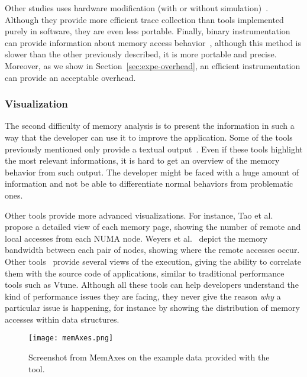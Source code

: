 Other studies uses hardware modification (with or without simulation)~\cite{Bao08HMTT,Martonosi92MemSpy}.
Although they provide more efficient trace collection than tools implemented purely in software, they are even less portable.
Finally, binary instrumentation can provide information about memory access behavior~\cite{DeRose02SIGMA}, although this method is slower than
the other previously described, it is more portable and precise. Moreover, as
we show in Section~\ref{sec:expe-overhead}, an efficient instrumentation can
provide an acceptable overhead.

\subsubsection{Visualization}

The second difficulty of memory analysis is to present the information in such
a way that the developer can use it to improve the application. Some of the tools
previously mentioned only provide a textual
output~\cite{Lachaize12MemProf,McCurdy2010,Martonosi92MemSpy}. Even if these
tools highlight the most relevant informations, it is hard to get an overview
of the memory behavior from such output. The developer might be faced with a huge
amount of information and not be able to differentiate normal behaviors from
problematic ones.


Other tools provide more advanced visualizations. For
instance, Tao et al.~\cite{Tao01Visualizing} propose a detailed view of each memory
page, showing the number of remote and local accesses from each NUMA node. Weyers et
al.~\cite{Weyers14Visualization} depict the memory bandwidth between each pair of nodes,
showing where the remote accesses occur. Other
tools~\cite{DeRose01Hardware,DeRose02SIGMA,Bosch00Rivet} provide several views
of the execution, giving the ability to correlate them with the source code of applications, similar to traditional performance tools such as Vtune. Although
all these tools can help developers understand the kind of
performance issues they are facing, they never give the reason \emph{why} a particular
issue is happening, for instance by showing the distribution of memory accesses within data structures.

\begin{figure}[htb]
    \centering
    \texttt{[image: memAxes.png]}
    \caption{Screenshot from MemAxes on the example data provided with the
    tool.}
    \label{fig:memaxes}
\end{figure}

